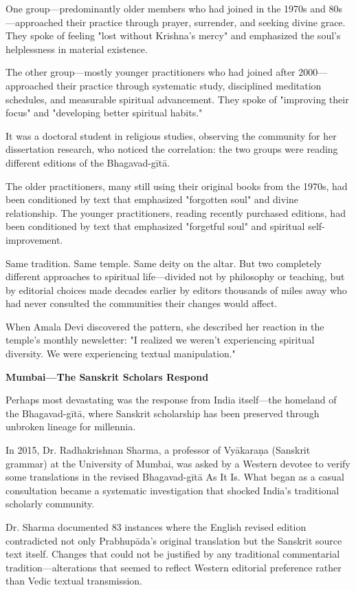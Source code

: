 \documentclass[12pt,twoside]{book}
\begin{document}
One group—predominantly older members who had joined in the 1970s and 80s—approached their practice through prayer, surrender, and seeking divine grace. They spoke of feeling "lost without Krishna's mercy" and emphasized the soul's helplessness in material existence.

The other group—mostly younger practitioners who had joined after 2000—approached their practice through systematic study, disciplined meditation schedules, and measurable spiritual advancement. They spoke of "improving their focus" and "developing better spiritual habits."

It was a doctoral student in religious studies, observing the community for her dissertation research, who noticed the correlation: the two groups were reading different editions of the Bhagavad-gītā.

The older practitioners, many still using their original books from the 1970s, had been conditioned by text that emphasized "forgotten soul" and divine relationship. The younger practitioners, reading recently purchased editions, had been conditioned by text that emphasized "forgetful soul" and spiritual self-improvement.

Same tradition. Same temple. Same deity on the altar. But two completely different approaches to spiritual life—divided not by philosophy or teaching, but by editorial choices made decades earlier by editors thousands of miles away who had never consulted the communities their changes would affect.

When Amala Devi discovered the pattern, she described her reaction in the temple's monthly newsletter: "I realized we weren't experiencing spiritual diversity. We were experiencing textual manipulation."

\textbf{\textbf{Mumbai—The Sanskrit Scholars Respond}}

Perhaps most devastating was the response from India itself—the homeland of the Bhagavad-gītā, where Sanskrit scholarship has been preserved through unbroken lineage for millennia.

In 2015, Dr. Radhakrishnan Sharma, a professor of Vyākaraṇa (Sanskrit grammar) at the University of Mumbai, was asked by a Western devotee to verify some translations in the revised Bhagavad-gītā As It Is. What began as a casual consultation became a systematic investigation that shocked India's traditional scholarly community.

Dr. Sharma documented 83 instances where the English revised edition contradicted not only Prabhupāda's original translation but the Sanskrit source text itself. Changes that could not be justified by any traditional commentarial tradition—alterations that seemed to reflect Western editorial preference rather than Vedic textual transmission.
\end{document}
